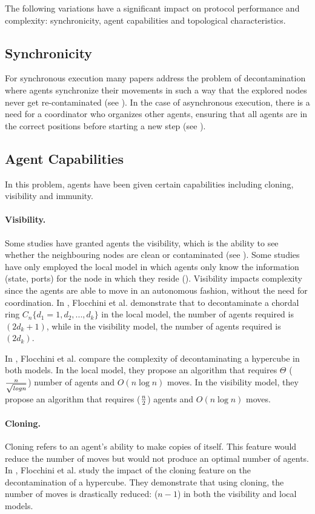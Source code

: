 The following variations have a significant impact on protocol performance and complexity: synchronicity, agent capabilities and topological characteristics.
\subsection{Synchronicity}
For synchronous execution many papers address the problem of decontamination where agents synchronize their movements in such a way that the explored nodes never get re-contaminated  (see \cite{lucetal22,floc21,baretal24}). In the case of asynchronous execution, there is a need for a coordinator who organizes other agents, ensuring that all agents are in the correct positions before starting a new step (see \cite{floetal13,lucetal22,floetal20,floetal19,floetal17}).


\subsection{Agent Capabilities}
In this problem, agents have been given certain capabilities including cloning, visibility and immunity.

\paragraph{ Visibility.}  Some studies have granted agents the visibility, which is the ability to see whether the neighbouring nodes are clean or contaminated (see \cite{floetal17,floetal20}). Some studies have only employed the local model in which agents only know the information (state, ports) for the node in which they reside (\cite{floetal19,floetal17,floetal20}). Visibility impacts complexity since the agents are able to move in an autonomous fashion, without the need for coordination. In \cite{floetal17}, Flocchini et al. demonstrate that to decontaminate a chordal ring $C_n\{d_1=1,d_2,...,d_k\}$ in the local model, the number of agents required is $(2d_k+1)$, while in the visibility model, the number of agents required is $(2  d_k)$.

 In \cite{floetal20}, Flocchini et al. compare the complexity of  decontaminating a hypercube in both models. In the local model, they propose an algorithm that requires  $\Theta$  ($n \over { \sqrt {log n}} $) number of agents and  $O(n \log n)$  moves. In the  visibility model, they propose an algorithm that requires ($n\over2$) agents and $O(n \log n)$ moves.



\paragraph{ Cloning.}
Cloning refers to an agent's ability to make copies of itself. This feature would reduce the number of moves but would not produce an optimal number of agents. In \cite{floetal20}, Flocchini et al. study the impact of the cloning feature on the decontamination of a hypercube. They demonstrate that using cloning, the number of moves is drastically reduced: ($n-1$) in both the visibility and local models.


